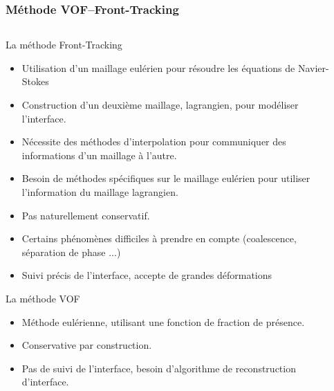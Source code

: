 \documentclass{beamer}
\begin{document}
\begin{frame}
    \frametitle{Méthode VOF--Front-Tracking}
    \scriptsize
    \begin{columns}[c]
    \begin{column}{0.7 \textwidth}
    \begin{ceablock}{La méthode Front-Tracking}
        \begin{itemize}
            \item Utilisation d'un maillage eulérien pour résoudre les équations de Navier-Stokes
            \item Construction d'un deuxième maillage, lagrangien, pour modéliser l'interface. 
            \item Nécessite des méthodes d'interpolation pour communiquer des informations d'un maillage à l'autre.
            \item Besoin de méthodes spécifiques sur le maillage eulérien pour utiliser l'information du maillage lagrangien.
            \item Pas naturellement conservatif.
            \item Certains phénomènes difficiles à prendre en compte (coalescence, séparation de phase ...) 
            \item Suivi précis de l'interface, accepte de grandes déformations
        \end{itemize}
    \end{ceablock}
\begin{ceablock}{La méthode VOF}
        \begin{itemize}
            \item Méthode eulérienne, utilisant une fonction de fraction de présence.
            \item Conservative par construction.
            \item Pas de suivi de l'interface, besoin d'algorithme de reconstruction d'interface.
            
        \end{itemize}
    \end{ceablock}
\end{column}
\begin{column}{0.3 \textwidth}
\begin{center}
		\begin{tikzpicture}[scale = 0.3, every node/.style={scale=0.3}]
			
		\end{tikzpicture}

\end{center}
\begin{center}
		\begin{tikzpicture}[scale = 0.3, every node/.style={scale=0.3}]
			
		\end{tikzpicture}

\end{center}
\end{column}
\end{columns}
\end{frame}
\end{document}
